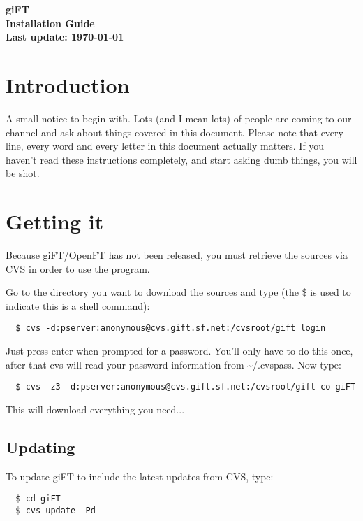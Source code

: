 \documentclass[10pt]{article}
\begin{document}
\begin{center}
\textsf{\textbf{\Huge{giFT}\\ \huge{Installation Guide}\\
\normalsize{Last update: \today}}}
\end{center}

\tableofcontents

\setlength{\parskip}{1.4ex}

\section{Introduction}
A small notice to begin with. Lots (and I mean lots) of people are coming to
our channel and ask about things covered in this document. Please note that
every line, every word and every letter in this document actually matters. If
you haven't read these instructions completely, and start asking dumb things,
you will be shot.

\section{Getting it}

Because giFT/OpenFT has not been released, you must retrieve the sources via 
CVS in order to use the program.

Go to the directory you want to download the sources and type (the \$ is used 
to indicate this is a shell command):

\begin{verbatim}
  $ cvs -d:pserver:anonymous@cvs.gift.sf.net:/cvsroot/gift login
\end{verbatim}

Just press enter when prompted for a password. You'll only have to do this
once, after that cvs will read your password information from \~{}/.cvspass.
Now type:

\begin{verbatim}
  $ cvs -z3 -d:pserver:anonymous@cvs.gift.sf.net:/cvsroot/gift co giFT
\end{verbatim}

This will download everything you need...

\subsection{Updating}
To update giFT to include the latest updates from CVS, type:

\begin{verbatim}
  $ cd giFT
  $ cvs update -Pd
\end{verbatim}
\end{document}
